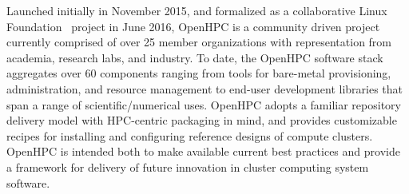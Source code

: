 Launched initially in November 2015, and formalized as a collaborative Linux
Foundation~\cite{LinuxFoundation_url} project in June 2016, OpenHPC is a
community driven project currently comprised of over 25 member organizations
with representation from academia, research labs, and industry. To date, the
OpenHPC software stack aggregates over 60 components ranging from tools for
bare-metal provisioning, administration, and resource management to end-user
development libraries that span a range of scientific/numerical uses. OpenHPC
adopts a familiar repository delivery model with HPC-centric packaging in mind,
and provides customizable recipes for installing and configuring reference
designs of compute clusters.  OpenHPC is intended both to make available
current best practices and provide a framework for delivery of future
innovation in cluster computing system software.
